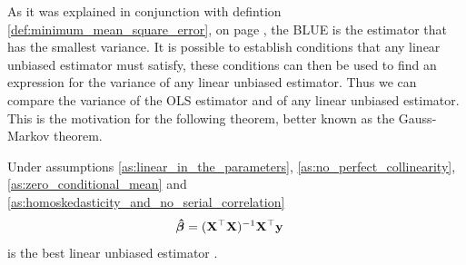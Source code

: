As it was explained in conjunction with defintion \ref{def:minimum_mean_square_error}, on page \pageref{def:minimum_mean_square_error}, the BLUE is the estimator that has the smallest variance.
It is possible to establish conditions that any linear unbiased estimator must satisfy, these conditions can then be used to find an expression for the variance of any linear unbiased estimator.
Thus we can compare the variance of the OLS estimator and of any linear unbiased estimator.
This is the motivation for the following theorem, better known as the Gauss-Markov theorem.
\begin{theorem}
    Under assumptions \ref{as:linear_in_the_parameters}, \ref{as:no_perfect_collinearity}, \ref{as:zero_conditional_mean} and \ref{as:homoskedasticity_and_no_serial_correlation} 
    \begin{align*}
        \operatorname{\boldsymbol{\hat{\beta}}} &= (\mathbf{X}^\top\mathbf{X})^{-1}\mathbf{X}^\top\mathbf{y}
    \end{align*}
    is the best linear unbiased estimator \cite[p. 811]{Wooldridge2012}.
\end{theorem}\label{th:gauss_markoc_theorem}
